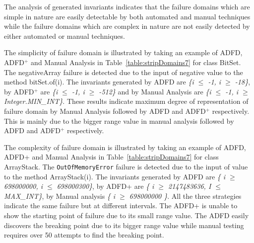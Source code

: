 The analysis of generated invariants indicates that the failure domains which are simple in nature are easily detectable by both automated and manual techniques while the failure domains which are complex in nature are not easily detected by either automated or manual techniques. %

The simplicity of failure domain is illustrated by taking an example of ADFD, ADFD$^+$ and Manual Analysis in Table~\ref{table:stripDomains7} for class BitSet. The negativeArray failure is detected due to the input of negative value to the method bitSet.of(i). The invariants generated by ADFD are \textit{\{i $\le$ -1, i $\ge$ -18\}}, by ADFD$^+$ are \textit{\{i $\le$ -1, i $\ge$ -512\}} and by Manual Analysis are \textit{\{i $\le$ -1, i $\ge$ Integer.MIN\_INT\}}. These results indicate maximum degree of representation of failure domain by Manual Analysis followed by ADFD and ADFD$^+$ respectively. This is mainly due to the bigger range value in manual analysis followed by ADFD and ADFD$^+$ respectively. 


The complexity of failure domain is illustrated by taking an example of ADFD, ADFD+ and Manual Analysis in Table~\ref{table:stripDomains7} for class ArrayStack. The \verb+OutOfMemoryError+ failure is detected due to the input of value to the method ArrayStack(i). The invariants generated by ADFD are \textit{\{ i $\ge$ 698000000, i $\le$ 698000300\}}, by ADFD+ are \textit{\{ i $\ge$ 2147483636, I $\le$ MAX\_INT\}}, by Manual analysis \textit{\{ i $\ge$ 698000000 \}}. All the three strategies indicate the same failure but at different intervals. The ADFD+ is unable to show the starting point of failure due to its small range value. The ADFD easily discovers the breaking point due to its bigger range value while manual testing requires over 50 attempts to find the breaking point.





